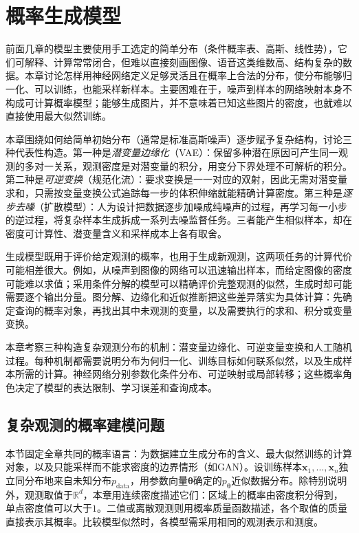 \chapter{概率生成模型}
\label{chap:pgm-generative}

前面几章的模型主要使用手工选定的简单分布（条件概率表、高斯、线性势），它们可解释、计算常常闭合，但难以直接刻画图像、语音这类维数高、结构复杂的数据。本章讨论怎样用神经网络定义足够灵活且在概率上合法的分布，使分布能够归一化、可以训练，也能采样新样本。主要困难在于，噪声到样本的网络映射本身不构成可计算概率模型；能够生成图片，并不意味着已知这些图片的密度，也就难以直接使用最大似然训练。

本章围绕如何给简单初始分布（通常是标准高斯噪声）逐步赋予复杂结构，讨论三种代表性构造。第一种是\emph{潜变量边缘化}（VAE）：保留多种潜在原因可产生同一观测的多对一关系，观测密度是对潜变量的积分，用变分下界处理不可解析的积分。第二种是\emph{可逆变换}（规范化流）：要求变换是一一对应的双射，因此无需对潜变量求和，只需按变量变换公式追踪每一步的体积伸缩就能精确计算密度。第三种是\emph{逐步去噪}（扩散模型）：人为设计把数据逐步加噪成纯噪声的过程，再学习每一小步的逆过程，将复杂样本生成拆成一系列去噪监督任务。三者能产生相似样本，却在密度可计算性、潜变量含义和采样成本上各有取舍。

生成模型既用于评价给定观测的概率，也用于生成新观测，这两项任务的计算代价可能相差很大。例如，从噪声到图像的网络可以迅速输出样本，而给定图像的密度可能难以求值；采用条件分解的模型可以精确评价完整观测的似然，生成时却可能需要逐个输出分量。图分解、边缘化和近似推断把这些差异落实为具体计算：先确定查询的概率对象，再找出其中未观测的变量，以及需要执行的求和、积分或变量变换。

本章考察三种构造复杂观测分布的机制：潜变量边缘化、可逆变量变换和人工随机过程。每种机制都需要说明分布为何归一化、训练目标如何联系似然，以及生成样本所需的计算。神经网络分别参数化条件分布、可逆映射或局部转移；这些概率角色决定了模型的表达限制、学习误差和查询成本。

\section{复杂观测的概率建模问题}

\label{sec:pgm-generative-common}

本节固定全章共同的概率语言：为数据建立生成分布的含义、最大似然训练的计算对象，以及只能采样而不能求密度的边界情形（如GAN）。设训练样本$\bm{x}_1,\ldots,\bm{x}_n$独立同分布地来自未知分布$p_{\mathrm{data}}$，用参数向量$\bm{\theta}$确定的$p_{\bm{\theta}}$近似数据分布。除特别说明外，观测取值于$\mathbb{R}^{d}$，本章用连续密度描述它们：区域上的概率由密度积分得到，单点密度值可以大于$1$。二值或离散观测则用概率质量函数描述，各个取值的质量直接表示其概率。比较模型似然时，各模型需采用相同的观测表示和测度。

